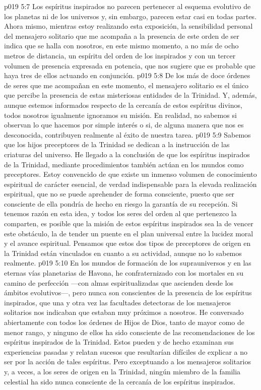 \vs p019 5:7 Los espíritus inspirados no parecen pertenecer al esquema evolutivo de los planetas ni de los universos y, sin embargo, parecen estar casi en todas partes. Ahora mismo, mientras estoy realizando esta exposición, la sensibilidad personal del mensajero solitario que me acompaña a la presencia de este orden de ser indica que se halla con nosotros, en este mismo momento, a no más de ocho metros de distancia, un espíritu del orden de los inspirados y con un tercer volumen de presencia expresada en potencia, que nos sugiere que es probable que haya tres de ellos actuando en conjunción.
\vs p019 5:8 \pc De los más de doce órdenes de seres que me acompañan en este momento, el mensajero solitario es el único que percibe la presencia de estas misteriosas entidades de la Trinidad. Y, además, aunque estemos informados respecto de la cercanía de estos espíritus divinos, todos nosotros igualmente ignoramos su misión. En realidad, no sabemos si observan lo que hacemos por simple interés o si, de alguna manera que nos es desconocida, contribuyen realmente al éxito de nuestra tarea.
\vs p019 5:9 Sabemos que los hijos preceptores de la Trinidad se dedican a la instrucción  de las criaturas del universo. He llegado a la conclusión de que los espíritus inspirados de la Trinidad, mediante procedimientos  también actúan en los mundos como preceptores. Estoy convencido de que existe un inmenso volumen de conocimiento espiritual de carácter esencial, de verdad indispensable para la elevada realización espiritual, que no se puede aprehender de forma consciente, puesto que ser consciente de ella pondría de hecho en riesgo la garantía de su recepción. Si tenemos razón en esta idea, y todos los seres del orden al que pertenezco la comparten, es posible que la misión de estos espíritus inspirados sea la de vencer este obstáculo, la de tender un puente en el plan universal entre la lucidez moral y el avance espiritual. Pensamos que estos dos tipos de preceptores de origen en la Trinidad están vinculados en cuanto a su actividad, aunque no lo sabemos realmente.
\vs p019 5:10 En los mundos de formación de los suprauniversos y en las eternas vías planetarias de Havona, he confraternizado con los mortales en su camino de perfección ---con almas espiritualizadas que ascienden desde los ámbitos evolutivos---, pero nunca son conscientes de la presencia de los espíritus inspirados, que una y otra vez las facultades detectoras de los mensajeros solitarios nos indicaban que estaban muy próximos a nosotros. He conversado abiertamente con todos los órdenes de Hijos de Dios, tanto de mayor como de menor rango, y ninguno de ellos ha sido consciente de las recomendaciones de los espíritus inspirados de la Trinidad. Estos pueden y de hecho examinan sus experiencias pasadas y relatan sucesos que resultarían difíciles de explicar a no ser por la acción de tales espíritus. Pero exceptuando a los mensajeros solitarios y, a veces, a los seres de origen en la Trinidad, ningún miembro de la familia celestial ha sido nunca consciente de la cercanía de los espíritus inspirados.
